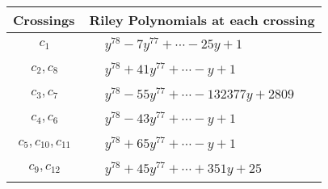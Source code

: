 \documentclass[1p]{elsarticle_modified}
\theoremstyle{definition}
\begin{document}
\begin{tabular}{m{50pt}|m{274pt}}
Crossings & \hspace{64pt}Riley Polynomials at each crossing \\
\hline $$\begin{aligned}c_{1}\end{aligned}$$&$\begin{aligned}
&y^{78}-7 y^{77}+\cdots-25 y+1
\end{aligned}$\\
\hline $$\begin{aligned}c_{2},c_{8}\end{aligned}$$&$\begin{aligned}
&y^{78}+41 y^{77}+\cdots- y+1
\end{aligned}$\\
\hline $$\begin{aligned}c_{3},c_{7}\end{aligned}$$&$\begin{aligned}
&y^{78}-55 y^{77}+\cdots-132377 y+2809
\end{aligned}$\\
\hline $$\begin{aligned}c_{4},c_{6}\end{aligned}$$&$\begin{aligned}
&y^{78}-43 y^{77}+\cdots- y+1
\end{aligned}$\\
\hline $$\begin{aligned}c_{5},c_{10},c_{11}\end{aligned}$$&$\begin{aligned}
&y^{78}+65 y^{77}+\cdots- y+1
\end{aligned}$\\
\hline $$\begin{aligned}c_{9},c_{12}\end{aligned}$$&$\begin{aligned}
&y^{78}+45 y^{77}+\cdots+351 y+25
\end{aligned}$\\
\hline
\end{tabular}
\vskip 2pc
\end{document}
